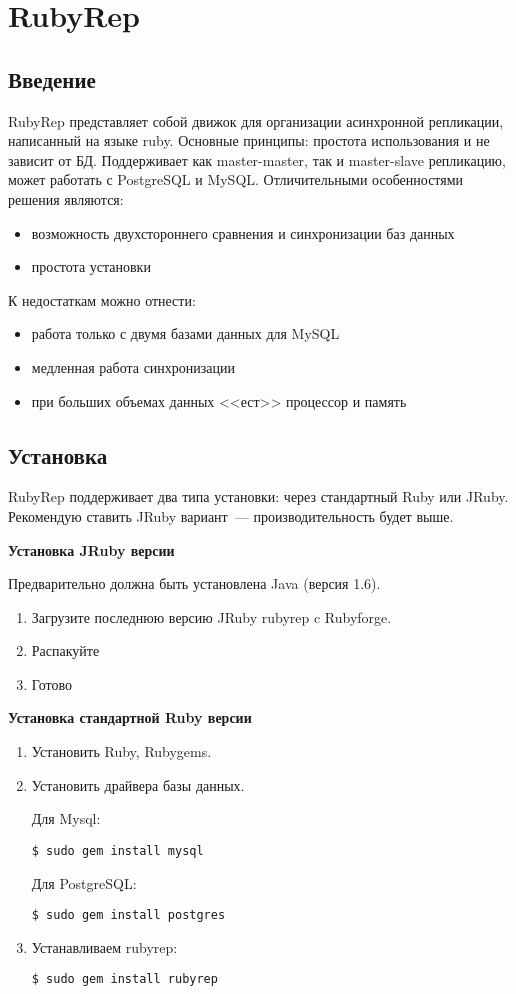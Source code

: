 \section{RubyRep}
\subsection{Введение}
RubyRep представляет собой движок для организации асинхронной репликации, написанный на языке ruby.
Основные принципы: простота использования и не зависит от БД.
Поддерживает как master-master, так и master-slave репликацию, может работать с PostgreSQL и MySQL.
Отличительными особенностями решения являются:
\begin{itemize}
\item возможность двухстороннего сравнения и синхронизации баз данных
\item простота установки
\end{itemize}
К недостаткам можно отнести:
\begin{itemize}
\item работа только с двумя базами данных для MySQL
\item медленная работа синхронизации
\item при больших объемах данных <<ест>> процессор и память
\end{itemize}


\subsection{Установка}
RubyRep поддерживает два типа установки: через стандартный Ruby или JRuby.
Рекомендую ставить JRuby вариант~--- производительность будет выше.

\textbf{Установка JRuby версии}

Предварительно должна быть установлена Java (версия 1.6).
\begin{enumerate}
 \item Загрузите последнюю версию JRuby rubyrep c Rubyforge.
 \item Распакуйте
 \item Готово
\end{enumerate}

\textbf{Установка стандартной Ruby версии}
\begin{enumerate}
\item Установить Ruby, Rubygems.
\item Установить драйвера базы данных.

Для Mysql:
\begin{lstlisting}[label=lst:rubyrep1,caption=Установка]
$ sudo gem install mysql
\end{lstlisting}

Для PostgreSQL:
\begin{lstlisting}[label=lst:rubyrep2,caption=Установка]
$ sudo gem install postgres
\end{lstlisting}

\item Устанавливаем rubyrep:
\begin{lstlisting}[label=lst:rubyrep3,caption=Установка]
$ sudo gem install rubyrep
\end{lstlisting}
\end{enumerate}


